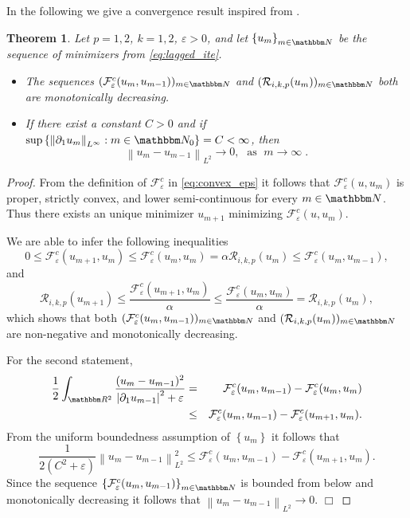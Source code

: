 \documentclass[runningheads,a4paper]{llncs}\usepackage{latexsym}
\newcommand{\R}{\mathbbm R}
\newcommand{\N}{\mathbbm N}
\newcommand{\ve}{\varepsilon}
\newcommand{\abs}[1]{\left| #1 \right|}
\newcommand{\set}[1]{\left\{ #1 \right\}}
\newcommand{\norm}[1]{\left\| #1 \right\|}
\newtheorem{thm}{Theorem}
\begin{document}
In the following we give a convergence result inspired from \cite{ChaMul99}.
\begin{thm}
Let $p=1,2$, $k=1,2$, $\ve >0$,
and let $\set{u_m}_{m \in \N}$ be the sequence of minimizers from \eqref{eq:lagged_ite}. 
\begin{itemize}
\item[1.] The sequences $(\mathcal{F}^c_\ve(u_m,u_{m-1}))_{m \in \N}$ and $(\mathcal{R}_{i,k,p}(u_m))_{m \in \N}$ both are monotonically decreasing.
\item[2.] If there exist a constant $C > 0$ and if $\sup \set{\norm{\partial_1 u_m}_{L^\infty}: m \in \N_0} = C < \infty$, 
          then 
          \[\norm{u_m-u_{m-1}}_{L^2}\rightarrow 0,\;\text{ as }\; m\rightarrow \infty\;.\]
\end{itemize}
\end{thm}

\begin{proof}
From the definition of $\mathcal{F}^c_\ve$ in \eqref{eq:convex_eps} it follows that $\mathcal{F}^c_\ve(u,u_m)$ is proper, 
strictly convex, and lower semi-continuous for every $m \in \N$. Thus there exists an unique minimizer $u_{m+1}$ minimizing $\mathcal{F}^c_\ve(u,u_m)$.

We are able to infer the following inequalities
\[0\leq \mathcal{F}^c_\ve(u_{m+1},u_m)\leq \mathcal{F}^c_\ve(u_m,u_m)=\alpha \mathcal{R}_{i,k,p}(u_m)\leq \mathcal{F}^c_\ve(u_m,u_{m-1}),\]
and
\[\mathcal{R}_{i,k,p}(u_{m+1})\leq \frac{ \mathcal{F}^c_\ve(u_{m+1},u_m)}{\alpha}\leq \frac{\mathcal{F}^c_\ve(u_m,u_m)}{\alpha}= \mathcal{R}_{i,k,p}(u_m),\]
which shows that both $(\mathcal{F}^c_\ve(u_m,u_{m-1}))_{m \in \N}$ and $(\mathcal{R}_{i,k,p}(u_m))_{m \in \N}$ are non-negative and monotonically decreasing.

For the second statement,
\begin{eqnarray*}
\frac{1}{2}\int_{\R^2} \frac{(u_m-u_{m-1})^2 }{\abs{\partial_1 u_{m-1}}^2+\ve}
&= &\mathcal{F}^c_\ve(u_m,u_{m-1}) -\mathcal{F}^c_\ve(u_m,u_m)\\
&\leq& \mathcal{F}^c_\ve(u_m,u_{m-1})-\mathcal{F}^c_\ve(u_{m+1},u_m).
\end{eqnarray*}
From the uniform boundedness assumption of $\set{u_m}$ it follows that
\[\frac{1}{2 (C^2 + \ve)} \norm{u_m-u_{m-1}}^2_{L^2}\leq \mathcal{F}^c_\ve(u_m,u_{m-1})-\mathcal{F}^c_\ve(u_{m+1},u_m).\]
Since the sequence $\set{\mathcal{F}^c_\ve(u_m,u_{m-1})}_{m \in \N}$ is bounded from below and monotonically decreasing
it follows that $\norm{u_m-u_{m-1}}_{L^2}\rightarrow 0$.
\hfill $\Box$
\end{proof}
\end{document}
